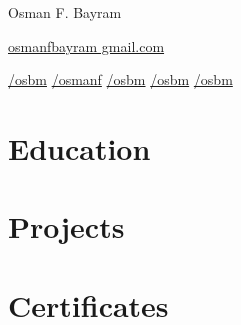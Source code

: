 \documentclass{resume-class} %
\author{Osman Faruk Bayram}
\begin{document}
\LARGE

Osman F. Bayram





\href{mailto://osmanfbayram@gmail.com}{osmanfbayram  gmail.com}\\


\makesidebar

\href{http://github.com/osbm}{/osbm} \quad
{}\href{https://www.kaggle.com/osmanf}{/osmanf} \quad
{}\href{https://www.linkedin.com/in/osbm}{/osbm} \quad
{}\href{https://www.researchgate.net/profile/Osman-Faruk-Bayram}{/osbm} \quad
{}\href{https://orcid.org/0000-0002-4346-5356}{/osbm} \quad

\section{Education}

\section{Projects}

\section{Certificates}



\footer
\end{document}
